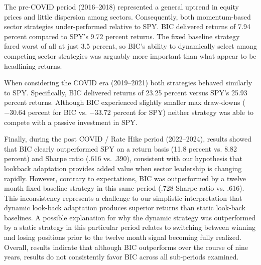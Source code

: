 \documentclass[12pt]{article}
\begin{document}
The pre-COVID period (2016--2018) represented a general uptrend in equity prices and little dispersion among sectors. Consequently, both momentum-based sector strategies under-performed relative to SPY. BIC delivered returns of 7.94 percent compared to SPY's 9.72 percent returns. The fixed baseline strategy fared worst of all at just 3.5 percent, so BIC's ability to dynamically select among competing sector strategies was arguably more important than what appear to be headlining returns.

When considering the COVID era (2019--2021) both strategies behaved similarly to SPY. Specifically, BIC delivered returns of 23.25 percent versus SPY's 25.93 percent returns. Although BIC experienced slightly smaller max draw-downs ($-30.64$ percent for BIC vs. $-33.72$ percent for SPY) neither strategy was able to compete with a passive investment in SPY.

Finally, during the post COVID / Rate Hike period (2022--2024), results showed that BIC clearly outperformed SPY on a return basis (11.8 percent vs. 8.82 percent) and Sharpe ratio (.616 vs. .390), consistent with our hypothesis that lookback adaptation provides added value when sector leadership is changing rapidly. However, contrary to expectations, BIC was outperformed by a twelve month fixed baseline strategy in this same period (.728 Sharpe ratio vs. .616). This inconsistency represents a challenge to our simplistic interpretation that dynamic look-back adaptation produces superior returns than static look-back baselines. A possible explanation for why the dynamic strategy was outperformed by a static strategy in this particular period relates to switching between winning and losing positions prior to the twelve month signal becoming fully realized. Overall, results indicate that although BIC outperforms over the course of nine years, results do not consistently favor BIC across all sub-periods examined.
\end{document}
